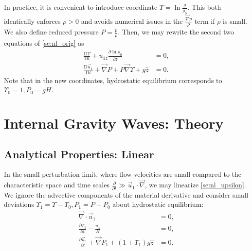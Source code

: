 \documentclass[
        fleqn,
        usenatbib,
    ]{mnras}
\newcommand*{\pd}[2]{\frac{\partial#1}{\partial#2}}
\newcommand*{\md}[2]{\frac{\mathrm{D}#1}{\mathrm{D}#2}}
\newcommand*{\p}[1]{\left(#1\right)}
\begin{document}
In practice, it is convenient to introduce coordinate $\Upsilon = \ln
\frac{\rho}{\rho_0}$. This both identically enforces $\rho > 0$ and avoids
numerical issues in the $\frac{\vec{\nabla}p}{\rho}$ term if $\rho$ is small. We
also define reduced pressure $P = \frac{p}{\rho}$. Then, we may rewrite the
second two equations of \autoref{se:nl_orig} as
\begin{subequations}\label{se:nl_upsilon}
    \begin{align}
        \md{\Upsilon}{t} + u_{1z} \pd{\ln \rho_0}{z} &= 0
            ,\label{eq:nl_up_density} \\
        \md{\vec{u}_1}{t} + \vec{\nabla}P + P\vec{\nabla}\Upsilon + g\hat{z} &= 0.
    \end{align}
\end{subequations}
Note that in the new coordinates, hydrostatic equilibrium corresponds to
$\Upsilon_0 = 1, P_0 = gH$.

\section{Internal Gravity Waves: Theory}\label{s:theory}

\subsection{Analytical Properties: Linear}

In the small perturbation limit, where flow velocities are small compared to the
characteristic space and time scales $\pd{}{t} \gg \vec{u}_1 \cdot \vec{\nabla}$,
we may linearize \autoref{se:nl_upsilon}. We ignore the advective components of the
material derivative and consider small deviations $\Upsilon_1 = \Upsilon -
\Upsilon_0, P_1 = P - P_0$ about hydrostatic equilibrium:
\begin{subequations}\label{se:lin_homo}
    \begin{align}
        \vec{\nabla} \cdot \vec{u}_1 &= 0,\\
        \pd{\Upsilon_1}{t} - \frac{u_{z}}{H} &= 0,\\
        \pd{\vec{u}_1}{t} + \vec{\nabla}P_1
            + \p{1 + \Upsilon_1} g\hat{z}
            &= 0.
    \end{align}
\end{subequations}
\end{document}
